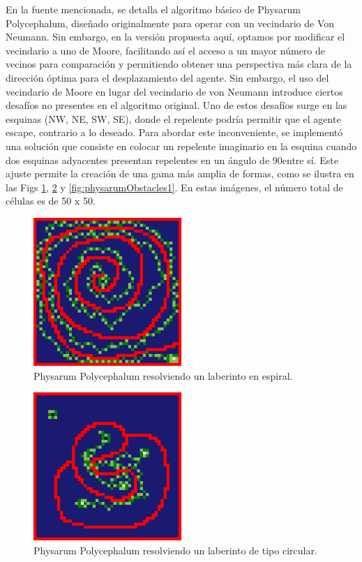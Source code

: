     \vskip 0.5cm
    En la fuente mencionada, se detalla el algoritmo b\'asico de Physarum Polycephalum, dise\~nado originalmente para operar con un vecindario de Von 
        Neumann. Sin embargo, en la versi\'on propuesta aqu\'i, optamos por modificar el vecindario a uno de Moore, 
        facilitando as\'i el acceso a un mayor n\'umero de vecinos para comparaci\'on y permitiendo obtener una perspectiva m\'as clara de la direcci\'on \'optima 
        para el desplazamiento del agente.
    \vskip 0.5cm
    Sin embargo, el uso del vecindario de Moore en lugar del vecindario de von Neumann introduce ciertos desaf\'ios no presentes en el algoritmo original. 
        Uno de estos desaf\'ios surge en las esquinas (NW, NE, SW, SE), donde el repelente podr\'ia permitir que el agente escape, 
        contrario a lo deseado. Para abordar este inconveniente, se implement\'o una soluci\'on que consiste en colocar un repelente imaginario en la esquina cuando 
        dos esquinas adyacentes presentan repelentes en un \'angulo de 90\degree  entre s\'i. Este ajuste permite la creaci\'on de una gama m\'as amplia de formas, 
        como se ilustra en las Figs \ref{fig:physarumCircle1}, 
        \ref{fig:physarumRandom1} y \ref{fig:physarumObstacles1}. En estas im\'agenes, el n\'umero total de c\'elulas es de 50 x 50.
    \vskip 0.5cm
    \begin{figure}[htbp]
        \centerline{\includegraphics[width=0.5\textwidth]{./images/desarrollo/physarum/Circular1.png}}
        \caption{Physarum Polycephalum resolviendo un laberinto en espiral.} 
        \label{fig:physarumCircle1}    
    \end{figure}
    \begin{figure}[htbp]
        \centerline{\includegraphics[width=0.5\textwidth]{./images/desarrollo/physarum/Random1.png}}
        \caption{Physarum Polycephalum resolviendo un laberinto de tipo circular.}
        \label{fig:physarumRandom1}    
    \end{figure}
